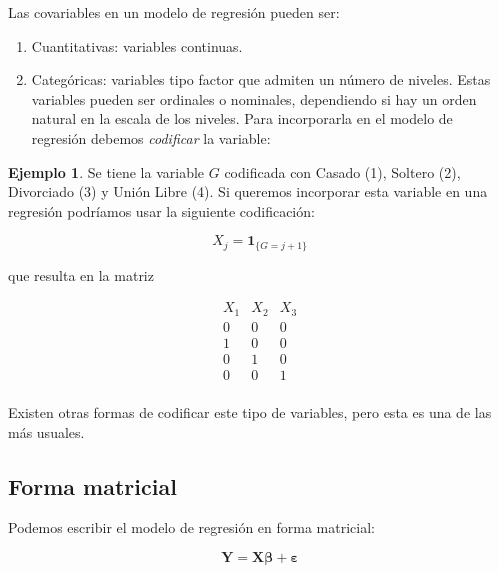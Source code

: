 \documentclass[
  12pt,
]{book}
\providecommand{\tightlist}{%
  \setlength{\itemsep}{0pt}\setlength{\parskip}{0pt}}
\theoremstyle{definition}
\theoremstyle{definition}
\newtheorem{example}{Ejemplo}[chapter]
\theoremstyle{definition}
\theoremstyle{definition}
\theoremstyle{remark}
\begin{document}
Las covariables en un modelo de regresión pueden ser:

\begin{enumerate}
\def\labelenumi{\arabic{enumi}.}
\tightlist
\item
  Cuantitativas: variables continuas.
\item
  Categóricas: variables tipo factor que admiten un número de niveles. Estas variables pueden ser ordinales o nominales, dependiendo si hay un orden natural en la escala de los niveles. Para incorporarla en el modelo de regresión debemos \emph{codificar} la variable:
\end{enumerate}

\begin{example}
\protect\hypertarget{exm:unnamed-chunk-106}{}\label{exm:unnamed-chunk-106}Se tiene la variable \(G\) codificada con Casado (1), Soltero (2), Divorciado (3) y Unión Libre (4). Si queremos incorporar esta variable en una regresión podríamos usar la siguiente codificación:

\begin{equation*}
X_{j} = \mathbf{1}_{\{G=j+1\}} 
\end{equation*}

que resulta en la matriz

\begin{equation*}
\begin{matrix}
X_{1} & X_{2} & X_{3}\\
0 & 0 & 0 \\
1 & 0 & 0 \\
0 & 1 & 0 \\
0 & 0 & 1 \\
\end{matrix}
\end{equation*}

Existen otras formas de codificar este tipo de variables, pero esta es una de las más usuales.
\end{example}

\hypertarget{forma-matricial}{%
\subsection{Forma matricial}\label{forma-matricial}}

Podemos escribir el modelo de regresión en forma matricial:

\begin{equation*}
\boldsymbol{Y} = \boldsymbol{X}\boldsymbol{\beta} + \boldsymbol{\varepsilon}
\end{equation*}
\end{document}
